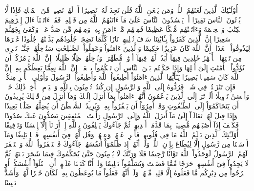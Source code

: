 أُوْلَـٰٓئِكَ ٱلَّذِينَ لَعَنَهُمُ ٱللَّهُۖ وَمَن يَلۡعَنِ ٱللَّهُ فَلَن تَجِدَ لَهُۥ نَصِيرًا
أَمۡ لَهُمۡ نَصِيبٞ مِّنَ ٱلۡمُلۡكِ فَإِذٗا لَّا يُؤۡتُونَ ٱلنَّاسَ نَقِيرًا
أَمۡ يَحۡسُدُونَ ٱلنَّاسَ عَلَىٰ مَآ ءَاتَىٰهُمُ ٱللَّهُ مِن فَضۡلِهِۦۖ فَقَدۡ ءَاتَيۡنَآ ءَالَ إِبۡرَٰهِيمَ ٱلۡكِتَٰبَ وَٱلۡحِكۡمَةَ وَءَاتَيۡنَٰهُم مُّلۡكًا عَظِيمٗا
فَمِنۡهُم مَّنۡ ءَامَنَ بِهِۦ وَمِنۡهُم مَّن صَدَّ عَنۡهُۚ وَكَفَىٰ بِجَهَنَّمَ سَعِيرًا
إِنَّ ٱلَّذِينَ كَفَرُواْ بِـَٔايَٰتِنَا سَوۡفَ نُصۡلِيهِمۡ نَارٗا كُلَّمَا نَضِجَتۡ جُلُودُهُم بَدَّلۡنَٰهُمۡ جُلُودًا غَيۡرَهَا لِيَذُوقُواْ ٱلۡعَذَابَۗ إِنَّ ٱللَّهَ كَانَ عَزِيزًا حَكِيمٗا
وَٱلَّذِينَ ءَامَنُواْ وَعَمِلُواْ ٱلصَّـٰلِحَٰتِ سَنُدۡخِلُهُمۡ جَنَّـٰتٖ تَجۡرِي مِن تَحۡتِهَا ٱلۡأَنۡهَٰرُ خَٰلِدِينَ فِيهَآ أَبَدٗاۖ لَّهُمۡ فِيهَآ أَزۡوَٰجٞ مُّطَهَّرَةٞۖ وَنُدۡخِلُهُمۡ ظِلّٗا ظَلِيلًا
۞إِنَّ ٱللَّهَ يَأۡمُرُكُمۡ أَن تُؤَدُّواْ ٱلۡأَمَٰنَٰتِ إِلَىٰٓ أَهۡلِهَا وَإِذَا حَكَمۡتُم بَيۡنَ ٱلنَّاسِ أَن تَحۡكُمُواْ بِٱلۡعَدۡلِۚ إِنَّ ٱللَّهَ نِعِمَّا يَعِظُكُم بِهِۦٓۗ إِنَّ ٱللَّهَ كَانَ سَمِيعَۢا بَصِيرٗا
يَـٰٓأَيُّهَا ٱلَّذِينَ ءَامَنُوٓاْ أَطِيعُواْ ٱللَّهَ وَأَطِيعُواْ ٱلرَّسُولَ وَأُوْلِي ٱلۡأَمۡرِ مِنكُمۡۖ فَإِن تَنَٰزَعۡتُمۡ فِي شَيۡءٖ فَرُدُّوهُ إِلَى ٱللَّهِ وَٱلرَّسُولِ إِن كُنتُمۡ تُؤۡمِنُونَ بِٱللَّهِ وَٱلۡيَوۡمِ ٱلۡأٓخِرِۚ ذَٰلِكَ خَيۡرٞ وَأَحۡسَنُ تَأۡوِيلًا
أَلَمۡ تَرَ إِلَى ٱلَّذِينَ يَزۡعُمُونَ أَنَّهُمۡ ءَامَنُواْ بِمَآ أُنزِلَ إِلَيۡكَ وَمَآ أُنزِلَ مِن قَبۡلِكَ يُرِيدُونَ أَن يَتَحَاكَمُوٓاْ إِلَى ٱلطَّـٰغُوتِ وَقَدۡ أُمِرُوٓاْ أَن يَكۡفُرُواْ بِهِۦۖ وَيُرِيدُ ٱلشَّيۡطَٰنُ أَن يُضِلَّهُمۡ ضَلَٰلَۢا بَعِيدٗا
وَإِذَا قِيلَ لَهُمۡ تَعَالَوۡاْ إِلَىٰ مَآ أَنزَلَ ٱللَّهُ وَإِلَى ٱلرَّسُولِ رَأَيۡتَ ٱلۡمُنَٰفِقِينَ يَصُدُّونَ عَنكَ صُدُودٗا
فَكَيۡفَ إِذَآ أَصَٰبَتۡهُم مُّصِيبَةُۢ بِمَا قَدَّمَتۡ أَيۡدِيهِمۡ ثُمَّ جَآءُوكَ يَحۡلِفُونَ بِٱللَّهِ إِنۡ أَرَدۡنَآ إِلَّآ إِحۡسَٰنٗا وَتَوۡفِيقًا
أُوْلَـٰٓئِكَ ٱلَّذِينَ يَعۡلَمُ ٱللَّهُ مَا فِي قُلُوبِهِمۡ فَأَعۡرِضۡ عَنۡهُمۡ وَعِظۡهُمۡ وَقُل لَّهُمۡ فِيٓ أَنفُسِهِمۡ قَوۡلَۢا بَلِيغٗا
وَمَآ أَرۡسَلۡنَا مِن رَّسُولٍ إِلَّا لِيُطَاعَ بِإِذۡنِ ٱللَّهِۚ وَلَوۡ أَنَّهُمۡ إِذ ظَّلَمُوٓاْ أَنفُسَهُمۡ جَآءُوكَ فَٱسۡتَغۡفَرُواْ ٱللَّهَ وَٱسۡتَغۡفَرَ لَهُمُ ٱلرَّسُولُ لَوَجَدُواْ ٱللَّهَ تَوَّابٗا رَّحِيمٗا
فَلَا وَرَبِّكَ لَا يُؤۡمِنُونَ حَتَّىٰ يُحَكِّمُوكَ فِيمَا شَجَرَ بَيۡنَهُمۡ ثُمَّ لَا يَجِدُواْ فِيٓ أَنفُسِهِمۡ حَرَجٗا مِّمَّا قَضَيۡتَ وَيُسَلِّمُواْ تَسۡلِيمٗا
وَلَوۡ أَنَّا كَتَبۡنَا عَلَيۡهِمۡ أَنِ ٱقۡتُلُوٓاْ أَنفُسَكُمۡ أَوِ ٱخۡرُجُواْ مِن دِيَٰرِكُم مَّا فَعَلُوهُ إِلَّا قَلِيلٞ مِّنۡهُمۡۖ وَلَوۡ أَنَّهُمۡ فَعَلُواْ مَا يُوعَظُونَ بِهِۦ لَكَانَ خَيۡرٗا لَّهُمۡ وَأَشَدَّ تَثۡبِيتٗا
